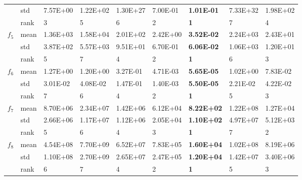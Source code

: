 \documentclass[a4paper,13pt,2p]{report}
\begin{document}
\begin{table}[!t]
{\begin{tabular}{|l|l|l|l|l|l|l|l|l|}
                     & std  & 7.57E+00 & 1.22E+02 & 1.30E+27 & 7.00E-01          & \textbf{1.01E-01}  & 7.33E+32 & 1.98E+02          \\ \cline{2-9} 
                     & rank & 3        & 5        & 6        & 2                 & \textbf{1}         & 7        & 4                 \\ \hline
\multirow{3}{*}{$f_5$}  & mean & 1.36E+03 & 1.58E+04 & 2.01E+02 & 2.42E+00          & \textbf{3.52E-02}  & 2.24E+03 & 2.43E+01          \\ \cline{2-9} 
                     & std  & 3.87E+02 & 5.57E+03 & 9.51E+01 & 6.70E-01          & \textbf{6.06E-02}  & 1.06E+03 & 1.20E+01          \\ \cline{2-9} 
                     & rank & 5        & 7        & 4        & 2                 & \textbf{1}         & 6        & 3                 \\ \hline
\multirow{3}{*}{$f_6$}  & mean & 1.27E+00 & 1.20E+00 & 3.27E-01 & 4.71E-03          & \textbf{5.65E-05}  & 1.02E+00 & 7.83E-02          \\ \cline{2-9} 
                     & std  & 3.01E-02 & 4.08E-02 & 1.47E-01 & 1.40E-03          & \textbf{5.50E-05}  & 2.21E-02 & 4.22E-02          \\ \cline{2-9} 
                     & rank & 7        & 6        & 4        & 2                 & \textbf{1}         & 5        & 3                 \\ \hline
\multirow{3}{*}{$f_7$}  & mean & 8.70E+06 & 2.34E+07 & 1.42E+06 & 6.12E+04          & \textbf{8.22E+02}  & 1.22E+08 & 1.27E+04          \\ \cline{2-9} 
                     & std  & 2.66E+06 & 1.17E+07 & 1.12E+06 & 2.05E+04          & \textbf{1.10E+02}  & 4.97E+07 & 5.12E+03          \\ \cline{2-9} 
                     & rank & 5        & 6        & 4        & 3                 & \textbf{1}         & 7        & 2                 \\ \hline
\multirow{3}{*}{$f_8$}  & mean & 4.54E+08 & 7.70E+09 & 6.52E+07 & 7.83E+05          & \textbf{1.60E+04}  & 1.02E+08 & 8.19E+06          \\ \cline{2-9} 
                     & std  & 1.10E+08 & 2.70E+09 & 2.65E+07 & 2.47E+05          & \textbf{1.20E+04}  & 1.42E+07 & 3.40E+06          \\ \cline{2-9} 
                     & rank & 6        & 7        & 4        & 2                 & \textbf{1}         & 5        & 3                 \\ \hline

\end{tabular}}
\end{table}
\end{document}
